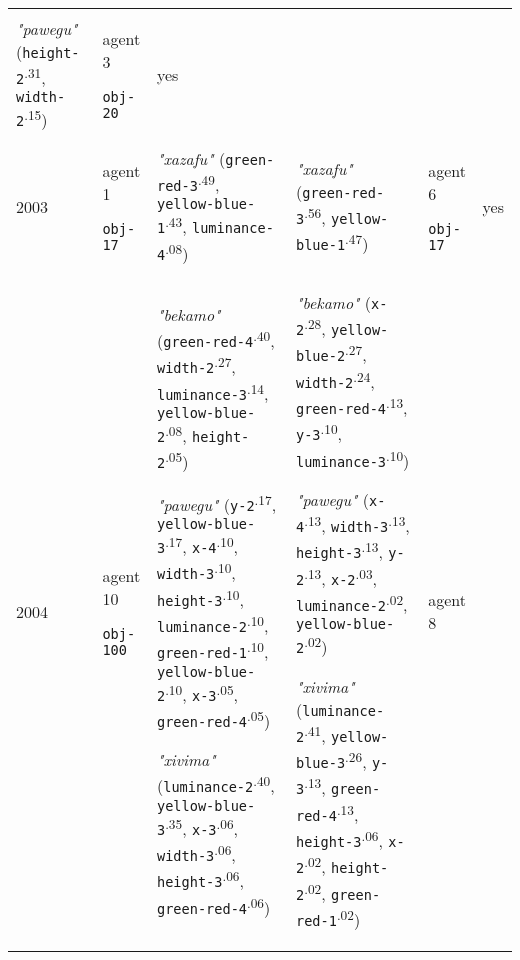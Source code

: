 {\begin{tabular}{p{0.4cm}p{1.4cm}p{7cm}p{7cm}p{1.4cm}p{0.6cm}}
\textit{"pawegu"} (\texttt{height-2}\textsuperscript{.31}, \texttt{width-2}\textsuperscript{.15}) & agent 3 

 \texttt{obj-20} & yes \\
2003 & agent 1 

\texttt{obj-17} &\textit{"xazafu"} (\texttt{green-red-3}\textsuperscript{.49}, \texttt{yellow-blue-1}\textsuperscript{.43}, \texttt{luminance-4}\textsuperscript{.08}) & \textit{"xazafu"} (\texttt{green-red-3}\textsuperscript{.56}, \texttt{yellow-blue-1}\textsuperscript{.47}) & agent 6 

 \texttt{obj-17} & yes \\
2004 & agent 10 

\texttt{obj-100} &\textit{"bekamo"} (\texttt{green-red-4}\textsuperscript{.40}, \texttt{width-2}\textsuperscript{.27}, \texttt{luminance-3}\textsuperscript{.14}, \texttt{yellow-blue-2}\textsuperscript{.08}, \texttt{height-2}\textsuperscript{.05})

\textit{"pawegu"} (\texttt{y-2}\textsuperscript{.17}, \texttt{yellow-blue-3}\textsuperscript{.17}, \texttt{x-4}\textsuperscript{.10}, \texttt{width-3}\textsuperscript{.10}, \texttt{height-3}\textsuperscript{.10}, \texttt{luminance-2}\textsuperscript{.10}, \texttt{green-red-1}\textsuperscript{.10}, \texttt{yellow-blue-2}\textsuperscript{.10}, \texttt{x-3}\textsuperscript{.05}, \texttt{green-red-4}\textsuperscript{.05})

\textit{"xivima"} (\texttt{luminance-2}\textsuperscript{.40}, \texttt{yellow-blue-3}\textsuperscript{.35}, \texttt{x-3}\textsuperscript{.06}, \texttt{width-3}\textsuperscript{.06}, \texttt{height-3}\textsuperscript{.06}, \texttt{green-red-4}\textsuperscript{.06}) & \textit{"bekamo"} (\texttt{x-2}\textsuperscript{.28}, \texttt{yellow-blue-2}\textsuperscript{.27}, \texttt{width-2}\textsuperscript{.24}, \texttt{green-red-4}\textsuperscript{.13}, \texttt{y-3}\textsuperscript{.10}, \texttt{luminance-3}\textsuperscript{.10})

\textit{"pawegu"} (\texttt{x-4}\textsuperscript{.13}, \texttt{width-3}\textsuperscript{.13}, \texttt{height-3}\textsuperscript{.13}, \texttt{y-2}\textsuperscript{.13}, \texttt{x-2}\textsuperscript{.03}, \texttt{luminance-2}\textsuperscript{.02}, \texttt{yellow-blue-2}\textsuperscript{.02})

\textit{"xivima"} (\texttt{luminance-2}\textsuperscript{.41}, \texttt{yellow-blue-3}\textsuperscript{.26}, \texttt{y-3}\textsuperscript{.13}, \texttt{green-red-4}\textsuperscript{.13}, \texttt{height-3}\textsuperscript{.06}, \texttt{x-2}\textsuperscript{.02}, \texttt{height-2}\textsuperscript{.02}, \texttt{green-red-1}\textsuperscript{.02}) & agent 8 


\end{tabular}}
